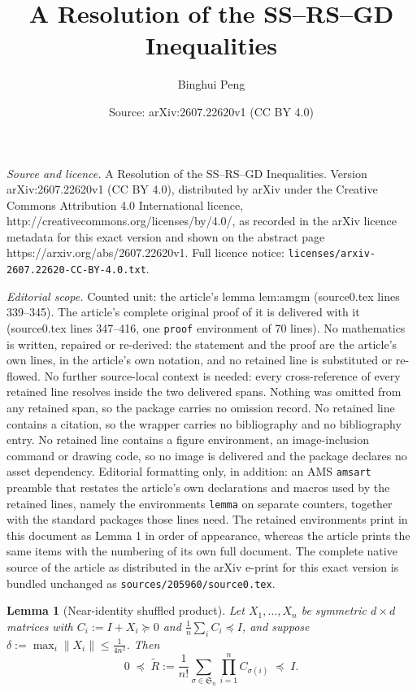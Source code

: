 \documentclass[10pt,a4paper]{amsart}
\title{A Resolution of the SS--RS--GD Inequalities}
\author{Binghui Peng}
\date{Source: arXiv:2607.22620v1 (CC BY 4.0)}
\newtheorem{lemma}{Lemma}
\newcommand{\Sn}{\mathfrak{S}_n}
\newcommand{\norm}[1]{\left\lVert #1 \right\rVert}
\newcommand{\psdge}{\succeq}
\newcommand{\psdle}{\preceq}
\begin{document}
\maketitle

\noindent\emph{Source and licence.} A Resolution of the SS--RS--GD Inequalities. Version arXiv:2607.22620v1 (CC BY 4.0), distributed by arXiv under the Creative Commons Attribution 4.0 International licence, http://creativecommons.org/licenses/by/4.0/, as recorded in the arXiv licence metadata for this exact version and shown on the abstract page https://arxiv.org/abs/2607.22620v1. Full licence notice: \texttt{licenses/arxiv-2607.22620-CC-BY-4.0.txt}.\par\smallskip

\noindent\textit{Editorial scope.} Counted unit: the article's lemma lem:amgm (source0.tex lines 339--345). The article's complete original proof of it is delivered with it (source0.tex lines 347--416, one \texttt{proof} environment of 70 lines). No mathematics is written, repaired or re-derived: the statement and the proof are the article's own lines, in the article's own notation, and no retained line is substituted or re-flowed.  No further source-local context is needed: every cross-reference of every retained line resolves inside the two delivered spans.  Nothing was omitted from any retained span, so the package carries no omission record.  No retained line contains a citation, so the wrapper carries no bibliography and no bibliography entry.  No retained line contains a figure environment, an image-inclusion command or drawing code, so no image is delivered and the package declares no asset dependency.  Editorial formatting only, in addition: an AMS \texttt{amsart} preamble that restates the article's own declarations and macros used by the retained lines, namely the environments \texttt{lemma} on separate counters, together with the standard packages those lines need.  The retained environments print in this document as Lemma 1 in order of appearance, whereas the article prints the same items with the numbering of its own full document.  The complete native source of the article as distributed in the arXiv e-print for this exact version is bundled unchanged as \texttt{sources/205960/source0.tex}.
\begin{lemma}[Near-identity shuffled product]\label{lem:amgm}
Let $X_1,\dots,X_n$ be symmetric $d\times d$ matrices with $C_i:=I+X_i\psdge0$ and
$\frac1n\sum_iC_i\psdle I$, and suppose $\delta:=\max_i\norm{X_i}\le\frac1{4n^2}$. Then
\[
0\;\psdle\;\widetilde R:=\frac1{n!}\sum_{\sigma\in\Sn}\prod_{i=1}^n C_{\sigma(i)}\;\psdle\;I.
\]
\end{lemma}
\end{document}

